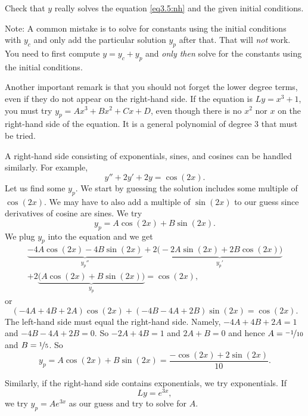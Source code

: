 \begin{exercise}
Check that $y$ really solves the equation \eqref{eq3.5:nh}
and the given initial conditions.
\end{exercise}

Note: A common mistake is to solve for constants using the initial
conditions with $y_c$ and only add the particular solution $y_p$ after that.
That will \emph{not} work.  You need to first compute $y = y_c + y_p$ and
\emph{only then} solve for the constants using the initial conditions.

Another important remark is that you should not forget the lower degree
terms, even if they do not appear on the right-hand side.  If the equation
is $Ly=x^3+1$, you must try $y_p = Ax^3+Bx^2+Cx+D$, even though there is
no $x^2$ nor $x$ on the right-hand side of the equation.  It is
a general polynomial of degree 3 that must be tried.

\medskip

A right-hand side consisting of exponentials, sines, and cosines
can be handled similarly.  For example,
\begin{equation*}
y''+2y'+2y = \cos (2x) .
\end{equation*}
Let us find some $y_p$.  We start by guessing the solution
includes some multiple of $\cos(2x)$.
We may have to also
add a multiple of $\sin (2x)$ to our guess since derivatives of cosine are
sines.  We try
\begin{equation*}
y_p = A \cos (2x) + B \sin (2x) .
\end{equation*}
We plug $y_p$ into the equation and we get
\begin{multline*}
\underbrace{-4 A \cos (2x) - 4 B \sin (2x)}_{y_p''}
+2 \underbrace{\bigl(-2A \sin (2x) + 2B \cos (2x)\bigr)}_{y_p'}
\\
+
2 \underbrace{\bigl(A \cos (2x) + B \sin (2x)\bigr)}_{y_p}
= \cos (2x) ,
\end{multline*}
or
\begin{equation*}
(-4A+4B+2A) \cos(2x) +
(-4B-4A+2B) \sin(2x)
= \cos(2x) .
\end{equation*}
The left-hand side must equal the right-hand side.  Namely,
$-4A + 4B + 2A = 1$ and
$-4B - 4A + 2B = 0$.  So $-2A+4B =1$ and $2A+B=0$ and hence
$A=\nicefrac{-1}{10}$ and $B=\nicefrac{1}{5}$.  So
\begin{equation*}
y_p = A \cos (2x) + B \sin (2x) = \frac{-\cos (2x) + 2 \sin (2x)}{10} .
\end{equation*}

Similarly, if the right-hand side contains exponentials, we try
exponentials.  If
\begin{equation*}
Ly = e^{3x},
\end{equation*}
we try $y_p = A e^{3x}$ as our guess and try to solve for $A$.

